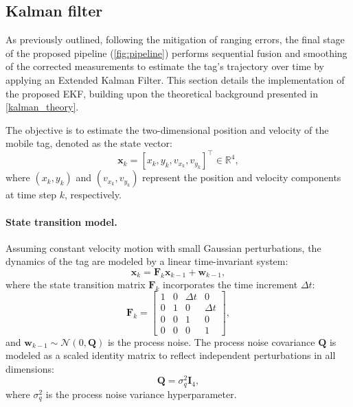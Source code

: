 \subsection{Kalman filter}

As previously outlined, following the mitigation of ranging errors, the final stage of the proposed pipeline (\autoref{fig:pipeline}) performs sequential fusion and smoothing of the corrected measurements to estimate the tag's trajectory over time by applying an Extended Kalman Filter. This section details the implementation of the proposed EKF, building upon the theoretical background presented in \autoref{kalman_theory}.

The objective is to estimate the two-dimensional position and velocity of the mobile tag, denoted as the state vector:
\begin{equation}
        \mathbf{x}_k = [x_k, y_k, v_{x_k}, v_{y_k}]^\top \in \mathbb{R}^4,
\end{equation}
where $(x_k, y_k)$ and $(v_{x_k}, v_{y_k})$ represent the position and velocity components at time step $k$, respectively.

\paragraph{State transition model.}

Assuming constant velocity motion with small Gaussian perturbations, the dynamics of the tag are modeled by a linear time-invariant system:
\begin{equation}
    \mathbf{x}_k = \mathbf{F}_k \mathbf{x}_{k-1} + \mathbf{w}_{k-1},
\end{equation}
where the state transition matrix $\mathbf{F}_k$ incorporates the time increment $\Delta t$:
\begin{equation}
    \mathbf{F}_k =
    \begin{bmatrix}
        1 & 0 & \Delta t & 0 \\
        0 & 1 & 0 & \Delta t \\
        0 & 0 & 1 & 0 \\
        0 & 0 & 0 & 1
    \end{bmatrix},
\end{equation}
and $\mathbf{w}_{k-1} \sim \mathcal{N}(0, \mathbf{Q})$ is the process noise. The process noise covariance $\mathbf{Q}$ is modeled as a scaled identity matrix to reflect independent perturbations in all dimensions:
\begin{equation}
    \mathbf{Q} = \sigma^2_q \mathbf{I}_4,
\end{equation}
where $\sigma^2_q$ is the process noise variance hyperparameter.


